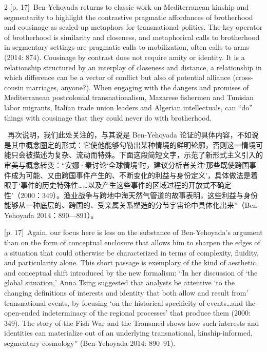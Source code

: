 \documentclass[10pt,a4paper]{article}
\begin{document}
\begin{paracol}{2}
\switchcolumn
{\scriptsize\color{gray} [p. 17]}\ Ben-Yehoyada returns to classic work on Mediterranean kinship and segmentarity to highlight the contrastive pragmatic affordances of brotherhood and cousinage as scaled-up metaphors for transnational politics. The key operator of brotherhood is similarity and closeness, and metaphorical calls to brotherhood in segmentary settings are pragmatic calls to mobilization, often calls to arms (2014: 874). Cousinage by contrast does not require amity or identity. It is a relationship structured by an interplay of closeness and distance, a relationship in which difference can be a vector of conflict but also of potential alliance (cross-cousin marriages, anyone?). When engaging with the dangers and promises of Mediterranean postcolonial transnationalism, Mazarese fishermen and Tunisian labor migrants, Italian trade union leaders and Algerian intellectuals, can “do” things with cousinage that they could never do with brotherhood.\par
\switchcolumn*
{\scriptsize\color{gray} [p. 17]}\ 再次说明，我们此处关注的，与其说是 Ben-Yehoyada 论证的具体内容，不如说是其中概念圈定的形式：它使他能够勾勒出某种情境的鲜明轮廓，否则这一情境可能只会被描述为复杂、流动而特殊。下面这段简短文字，示范了新形式主义引入的审美与概念转变：“安娜·秦讨论‘全球情境’时，建议分析者关注‘那些既使跨国事件成为可能、又由跨国事件产生的、不断变化的利益与身份定义’，具体做法是着眼于‘事件的历史特殊性……以及产生这些事件的区域过程的开放式不确定性’（2000：349）。渔业战争与跨地中海天然气管道的故事表明，这些利益与身份能够从一种底层的、跨国的、受亲属关系塑造的分节宇宙论中具体化出来”（Ben-Yehoyada 2014：890—891）。\par
\switchcolumn
{\scriptsize\color{gray} [p. 17]}\ Again, our focus here is less on the substance of Ben-Yehoyada’s argument than on the form of conceptual enclosure that allows him to sharpen the edges of a situation that could otherwise be characterized in terms of complexity, fluidity, and particularity alone. This short passage is exemplary of the kind of aesthetic and conceptual shift introduced by the new formalism: “In her discussion of ‘the global situation,’ Anna Tsing suggested that analysts be attentive ‘to the changing definitions of interests and identity that both allow and result from’ transnational events, by focusing ‘on the historical specificity of events…and the open-ended indeterminacy of the regional processes’ that produce them (2000: 349). The story of the Fish War and the Transmed shows how such interests and identities can materialize out of an underlying transnational, kinship-informed, segmentary cosmology” (Ben-Yehoyada 2014: 890–91).\par

\end{paracol}
\end{document}
